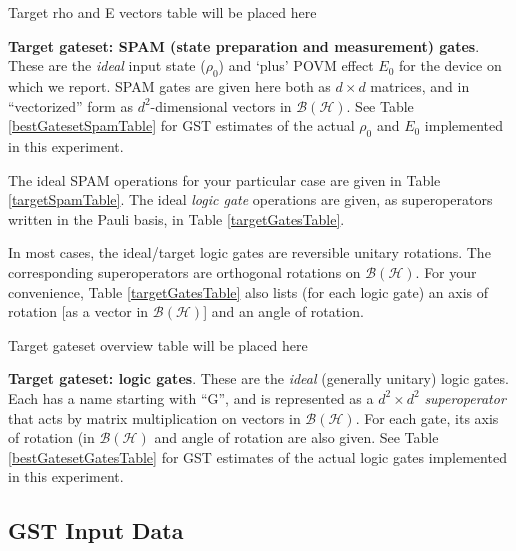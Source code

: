 \documentclass{article}[11pt]
\newcommand{\putfield}[2]{#2}
\begin{document}
\begin{table}[h]
\begin{center}
\putfield{targetSpamTable}{Target rho and E vectors table will be placed here}
\caption{\putfield{tt_targetSpamTable}{}\textbf{Target gateset: SPAM (state preparation and measurement) gates}.  These are the \emph{ideal} input state ($\rho_0$) and `plus' POVM effect $E_0$ for the device on which we report.  SPAM gates are given here both as $d\times d$ matrices, and in ``vectorized'' form as $d^2$-dimensional vectors in $\mathcal{B}(\mathcal{H})$.  See Table \ref{bestGatesetSpamTable} for GST estimates of the actual $\rho_0$ and $E_0$ implemented in this experiment.\label{targetSpamTable}}
\end{center}
\end{table}

The ideal SPAM operations for your particular case are given in Table \ref{targetSpamTable}.  The ideal \emph{logic gate} operations are given, as superoperators written in the Pauli basis, in Table \ref{targetGatesTable}.

In most cases, the ideal/target logic gates are reversible unitary rotations.  The corresponding superoperators are orthogonal rotations on $\mathcal{B}(\mathcal{H})$.  For your convenience, Table \ref{targetGatesTable} also lists (for each logic gate) an axis of rotation [as a vector in $\mathcal{B}(\mathcal{H})$] and an angle of rotation.  

\begin{table}[h]
\begin{center}
\putfield{targetGatesTable}{Target gateset overview table will be placed here}
\caption{\putfield{tt_targetGatesTable}{}\textbf{Target gateset: logic gates}.  These are the \emph{ideal} (generally unitary) logic gates.  Each has a name starting with ``G'', and is represented as a $d^2\times d^2$ \emph{superoperator} that acts by matrix multiplication on vectors in $\mathcal{B}(\mathcal{H})$.  For each gate, its axis of rotation (in $\mathcal{B}(\mathcal{H})$ and angle of rotation are also given.  See Table \ref{bestGatesetGatesTable} for GST estimates of the actual logic gates implemented in this experiment.\label{targetGatesTable}}
\end{center}
\end{table}

\subsection{GST Input Data}
\end{document}
